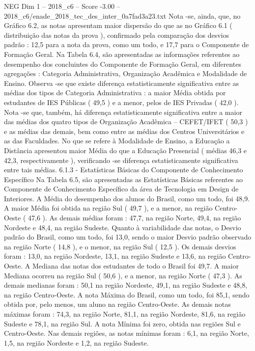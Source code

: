 \begin{textsample}{NEG Dim 1 – 2018\_c6 – Score -3.00 – 2018\_c6/enade\_2018\_tec\_des\_inter\_0a7fad3a23.txt}
Nota -se, ainda, que, no Gráfico 6.2, as notas apresentam maior dispersão do que as no Gráfico 6.1 ( distribuição das notas da prova ), confirmado pela comparação dos desvios padrão : 12,5 para a nota da prova, como um todo, e 17,7 para o Componente de Formação Geral.
Na Tabela 6.4, são apresentadas as informações referentes ao desempenho dos concluintes do Componente de Formação Geral, em diferentes agregações : Categoria Administrativa, Organização Acadêmica e Modalidade de Ensino.
Observa -se que existe diferença estatisticamente significativa entre as médias dos tipos de Categoria Administrativa : a maior Média obtida por estudantes de IES Públicas ( 49,5 ) e a menor, pelos de IES Privadas ( 42,0 ).
Nota -se que, também, há diferença estatisticamente significativa entre a maior das médias dos quatro tipos de Organização Acadêmica – CEFET/IFET ( 50,3 ) e as médias das demais, bem como entre as médias dos Centros Universitários e as das Faculdades.
No que se refere à Modalidade de Ensino, a Educação a Distância apresentou maior Média do que a Educação Presencial ( médias 46,3 e 42,3, respectivamente ), verificando -se diferença estatisticamente significativa entre tais médias. 6.1.3 - Estatísticas Básicas do Componente de Conhecimento Específico Na Tabela 6.5, são apresentadas as Estatísticas Básicas referentes ao Componente de Conhecimento Específico da área de Tecnologia em Design de Interiores.
A Média do desempenho dos alunos do Brasil, como um todo, foi 48,9.
A maior Média foi obtida na região Sul ( 49,7 ), e a menor, na região Centro-Oeste ( 47,6 ).
As demais médias foram : 47,7, na região Norte, 49,4, na região Nordeste e 48,4, na região Sudeste.
Quanto à variabilidade das notas, o Desvio padrão do Brasil, como um todo, foi 13,0, sendo o maior Desvio padrão observado na região Norte ( 14,8 ), e o menor, na região Sul ( 12,5 ).
Os demais desvios foram : 13,0, na região Nordeste, 13,1, na região Sudeste e 13,6, na região Centro-Oeste.
A Mediana das notas dos estudantes de todo o Brasil foi 49,7.
A maior Mediana ocorreu na região Sul ( 50,6 ), e a menor, na região Norte ( 47,3 ).
As demais medianas foram : 50,1 na região Nordeste, 49,1, na região Sudeste e 48,8, na região Centro-Oeste.
A nota Máxima do Brasil, como um todo, foi 85,1, sendo obtida por, pelo menos, um aluno na região Centro-Oeste.
As demais notas máximas foram : 74,3, na região Norte, 81,1, na região Nordeste, 81,6, na região Sudeste e 78,1, na região Sul.
A nota Mínima foi zero, obtida nas regiões Sul e Centro-Oeste.
Nas demais regiões, as notas mínimas foram : 6,1, na região Norte, 1,5, na região Nordeste e 1,2, na região Sudeste.

\end{textsample}
